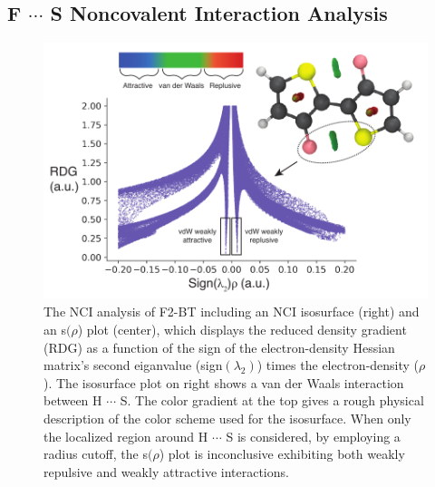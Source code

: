 \subsection{\texorpdfstring{F $\cdots$ S}{FSN} Noncovalent Interaction Analysis}
\begin{figure}[hbt!]
    \centering
    \includegraphics{figures/append_aroma/pt_f2_nciplot_copy.pdf}
    \caption{The NCI analysis of F2-BT including an NCI isosurface (right) and an s$(\rho$) plot (center), which displays the reduced density gradient (RDG) as a function of the sign of the electron-density Hessian matrix's second eiganvalue (sign$(\lambda_{2})$) times the electron-density ($\rho$). The isosurface plot on right shows a van der Waals interaction between H $\cdots$ S. The color gradient at the top gives a rough physical description of the color scheme used for the isosurface. When only the localized region around H $\cdots$ S is considered, by employing a radius cutoff, the s$(\rho$) plot is inconclusive exhibiting both weakly repulsive and weakly attractive interactions.}
    \label{fig:pt_f2_nci}
\end{figure}
\clearpage

